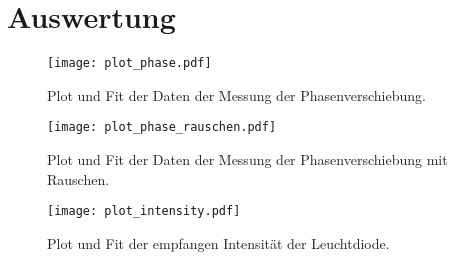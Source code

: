\section{Auswertung}
\label{sec:Auswertung}

\begin{figure}
  \centering
  \texttt{[image: plot\_phase.pdf]}
  \caption{Plot und Fit der Daten der Messung der Phasenverschiebung.}
  \label{fig:plot_phase}
\end{figure}

\begin{figure}
  \centering
  \texttt{[image: plot\_phase\_rauschen.pdf]}
  \caption{Plot und Fit der Daten der Messung der Phasenverschiebung mit Rauschen.}
  \label{fig:plot_phase_rauschen}
\end{figure}

\begin{figure}
  \centering
  \texttt{[image: plot\_intensity.pdf]}
  \caption{Plot und Fit der empfangen Intensität der Leuchtdiode.}
  \label{fig:plot_intensity}
\end{figure}